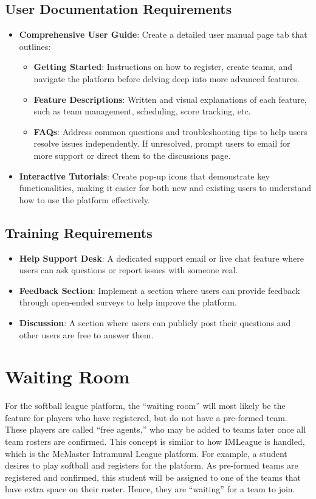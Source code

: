 \documentclass[12pt]{article}
\begin{document}
\subsection{User Documentation Requirements}
\begin{itemize}
    \item \textbf{Comprehensive User Guide}: Create a detailed user manual page tab that outlines:
    \begin{itemize}
        \item \textbf{Getting Started}: Instructions on how to register, create teams, and navigate the platform before delving deep into more advanced features.
        \item \textbf{Feature Descriptions}: Written and visual explanations of each feature, such as team management, scheduling, score tracking, etc.
        \item \textbf{FAQs}: Address common questions and troubleshooting tips to help users resolve issues independently. If unresolved, prompt users to email for more support or direct them to the discussions page.
    \end{itemize}
    \item \textbf{Interactive Tutorials}: Create pop-up icons that demonstrate key functionalities, making it easier for both new and existing users to understand how to use the platform effectively.
\end{itemize}

\subsection{Training Requirements}
\begin{itemize}
    \item \textbf{Help Support Desk}: A dedicated support email or live chat feature where users can ask questions or report issues with someone real.
    \item \textbf{Feedback Section}: Implement a section where users can provide feedback through open-ended surveys to help improve the platform.
    \item \textbf{Discussion}: A section where users can publicly post their questions and other users are free to answer them.
\end{itemize}

\section{Waiting Room}
For the softball league platform, the “waiting room” will most likely be the feature for players who have registered, but do not have a pre-formed team. These players are called “free agents,” who may be added to teams later once all team rosters are confirmed. This concept is similar to how IMLeague is handled, which is the McMaster Intramural League platform. For example, a student desires to play softball and registers for the platform. As pre-formed teams are registered and confirmed, this student will be assigned to one of the teams that have extra space on their roster. Hence, they are “waiting” for a team to join.
\end{document}
